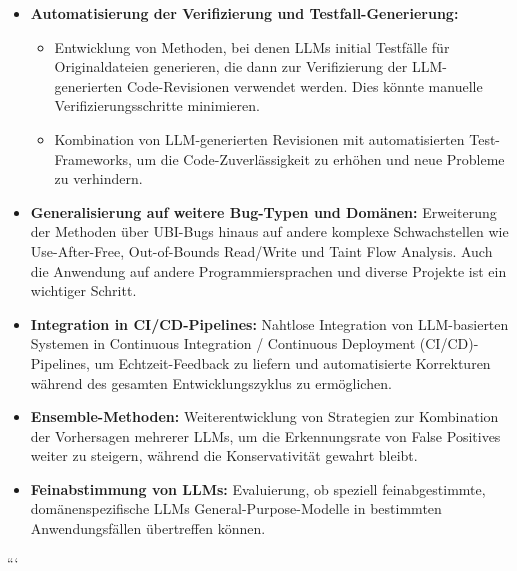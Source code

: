 \begin{itemize}
\begin{itemize}
    \end{itemize}
    \item \textbf{Automatisierung der Verifizierung und Testfall-Generierung:}
    \begin{itemize}
        \item Entwicklung von Methoden, bei denen LLMs initial Testfälle für Originaldateien generieren, die dann zur Verifizierung der LLM-generierten Code-Revisionen verwendet werden. Dies könnte manuelle Verifizierungsschritte minimieren.
        \item Kombination von LLM-generierten Revisionen mit automatisierten Test-Frameworks, um die Code-Zuverlässigkeit zu erhöhen und neue Probleme zu verhindern.
    \end{itemize}
    \item \textbf{Generalisierung auf weitere Bug-Typen und Domänen:} Erweiterung der Methoden über UBI-Bugs hinaus auf andere komplexe Schwachstellen wie Use-After-Free, Out-of-Bounds Read/Write und Taint Flow Analysis. Auch die Anwendung auf andere Programmiersprachen und diverse Projekte ist ein wichtiger Schritt.
    \item \textbf{Integration in CI/CD-Pipelines:} Nahtlose Integration von LLM-basierten Systemen in Continuous Integration / Continuous Deployment (CI/CD)-Pipelines, um Echtzeit-Feedback zu liefern und automatisierte Korrekturen während des gesamten Entwicklungszyklus zu ermöglichen.
    \item \textbf{Ensemble-Methoden:} Weiterentwicklung von Strategien zur Kombination der Vorhersagen mehrerer LLMs, um die Erkennungsrate von False Positives weiter zu steigern, während die Konservativität gewahrt bleibt.
    \item \textbf{Feinabstimmung von LLMs:} Evaluierung, ob speziell feinabgestimmte, domänenspezifische LLMs General-Purpose-Modelle in bestimmten Anwendungsfällen übertreffen können.
\end{itemize}
```